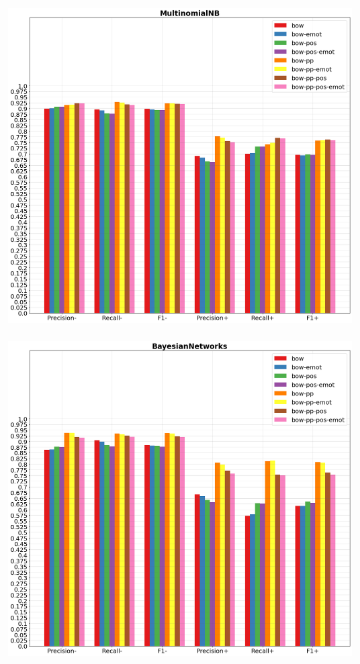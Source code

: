 \documentclass[oneside]{book}
\begin{document}
\begin{figure}[!h]
	\hspace*{-3cm}
	\begin{subfigure}[b]{0.5\textwidth}
		\centering
		\includegraphics[width=10cm]{assets/reports/micro/bow/MultinomialNB.png}
	\end{subfigure}
	\hfill
	\begin{subfigure}[b]{0.5\textwidth}
		\hspace*{0.15cm}
		\centering
		\includegraphics[width=10cm]{assets/reports/micro/bow/BayesianNetworks.png}
	\end{subfigure}
\end{figure}
\vfill
\end{document}

